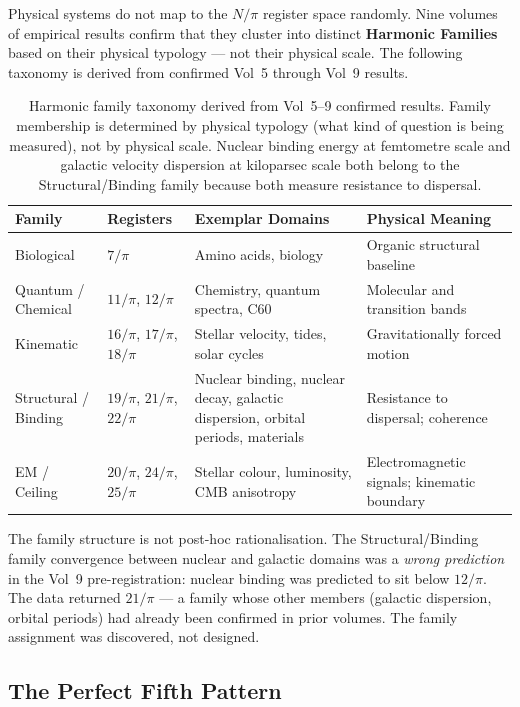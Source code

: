 \documentclass[12pt,oneside]{book}
\begin{document}
Physical systems do not map to the $N/\pi$ register space randomly. Nine volumes of
empirical results confirm that they cluster into distinct \textbf{Harmonic Families}
based on their physical typology — not their physical scale. The following taxonomy
is derived from confirmed Vol~5 through Vol~9 results.

\begin{table}[H]
\centering
\renewcommand{\arraystretch}{1.4}
\small
\begin{tabular}{|l|l|l|l|}
\hline
\rowcolor{blue!10}
\textbf{Family} & \textbf{Registers} & \textbf{Exemplar Domains} & \textbf{Physical Meaning} \\
\hline\hline
Biological & $7/\pi$ & Amino acids, biology & Organic structural baseline \\
\hline
Quantum / Chemical & $11/\pi$, $12/\pi$ & Chemistry, quantum spectra, C60 & Molecular and transition bands \\
\hline
Kinematic & $16/\pi$, $17/\pi$, $18/\pi$ & Stellar velocity, tides, solar cycles & Gravitationally forced motion \\
\hline
Structural / Binding & $19/\pi$, $21/\pi$, $22/\pi$ & Nuclear binding, nuclear decay,
galactic dispersion, orbital periods, materials & Resistance to dispersal; coherence \\
\hline
EM / Ceiling & $20/\pi$, $24/\pi$, $25/\pi$ & Stellar colour, luminosity,
CMB anisotropy & Electromagnetic signals; kinematic boundary \\
\hline
\end{tabular}
\caption{Harmonic family taxonomy derived from Vol~5--9 confirmed results.
Family membership is determined by physical typology (what kind of question
is being measured), not by physical scale. Nuclear binding energy at
femtometre scale and galactic velocity dispersion at kiloparsec scale both
belong to the Structural/Binding family because both measure resistance to
dispersal.}
\label{tab:harmonic_families}
\end{table}

The family structure is not post-hoc rationalisation. The Structural/Binding family
convergence between nuclear and galactic domains was a \emph{wrong prediction} in
the Vol~9 pre-registration: nuclear binding was predicted to sit below $12/\pi$.
The data returned $21/\pi$ — a family whose other members (galactic dispersion,
orbital periods) had already been confirmed in prior volumes. The family assignment
was discovered, not designed.

\subsection*{The Perfect Fifth Pattern}
\end{document}
